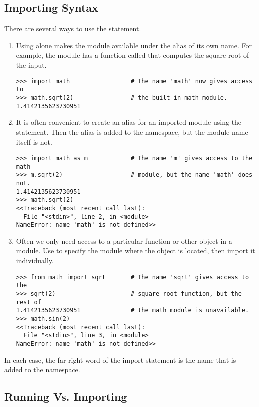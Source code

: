 \subsection*{Importing Syntax}
There are several ways to use the  statement.
\begin{enumerate}

\item Using  alone makes the module available under the alias of its own name. For example, the  module has a function called  that computes the square root of the input.
\begin{lstlisting}
>>> import math                 # The name 'math' now gives access to
>>> math.sqrt(2)                # the built-in math module.
1.4142135623730951
\end{lstlisting}

\item It is often convenient to create an alias for an imported module using the  statement. Then the alias is added to the namespace, but the module name itself is not.
\begin{lstlisting}
>>> import math as m            # The name 'm' gives access to the math
>>> m.sqrt(2)                   # module, but the name 'math' does not.
1.4142135623730951
>>> math.sqrt(2)
<<Traceback (most recent call last):
  File "<stdin>", line 2, in <module>
NameError: name 'math' is not defined>>
\end{lstlisting}

\item Often we only need access to a particular function or other object in a module.
Use  to specify the module where the object is located, then import it individually.
\begin{lstlisting}
>>> from math import sqrt       # The name 'sqrt' gives access to the
>>> sqrt(2)                     # square root function, but the rest of
1.4142135623730951              # the math module is unavailable.
>>> math.sin(2)
<<Traceback (most recent call last):
  File "<stdin>", line 3, in <module>
NameError: name 'math' is not defined>>
\end{lstlisting}
\end{enumerate}

In each case, the far right word of the import statement is the name that is added to the namespace.

\subsection*{Running Vs. Importing}

